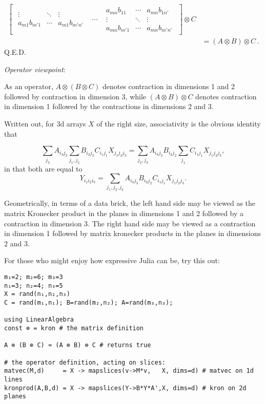 \documentclass[10pt,oneside]{article}
\begin{document}
\begin{enumerate}
\begin{align*}
\begin{bmatrix}
\begin{array}{ccc}
             \vdots & \ddots &           \vdots \\
  a_{m1}b_{m'1}  & \cdots & a_{m1}b_{m'n'} 
\end{array} & \cdots &  \begin{array}{ccc}
  a_{mn}b_{11}  & \cdots & a_{mn}b_{1n'} \\
             \vdots & \ddots &           \vdots \\
  a_{mn}b_{m'1}  & \cdots & a_{mn}b_{m'n'} 
\end{array}
\end{bmatrix} \otimes C \\
&= (A \otimes B) \otimes C \, .
\end{align*}
Q.E.D.

\newpage
\textit{Operator viewpoint}:

As an operator, $A \otimes (B \otimes C)$ denotes 
contraction in dimensions 1 and 2 followed
by contraction in dimension 3, while $(A \otimes B) \otimes C$ denotes contraction in dimension 1 followed by the contractions in dimensions 2 and 3.

Written out, for 3d arrays $X$ of the right size, associativity is the obvious identity that

$$\sum_{j_3}A_{i_3j_3}\sum_{j_1,j_2}  B_{i_2j_2}C_{i_1 j_1} X_{j_1j_2 j_3}
=
\sum_{j_2 ,j_3}A_{i_3j_3} B_{i_2j_2}
\sum_{j_1}C_{i_1 j_1} X_{j_1j_2 j_3} ,
$$
in that both are equal to
$$
Y_{i_1 i_2 i_3} = \sum_{j_1, j_2, j_3}A_{i_3j_3} B_{i_2j_2}
C_{i_1 j_1} X_{j_1j_2 j_3}.
$$

Geometrically, in terms of a data brick, the left hand side may be
viewed as the matrix Kronecker product in
the planes in dimensions 1 and 2 followed by
a contraction in dimension 3.  The right hand
side may be viewed as a contraction in dimension 1
followed by matrix kronecker products in the planes in dimensions 2 and 3.  

For those who might enjoy how expressive
Julia can be, try this out:

\begin{verbatim}
m₁=2; m₂=6; m₃=3
n₁=3; n₂=4; n₃=5
X = rand(n₁,n₂,n₃)
C = rand(m₁,n₁); B=rand(m₂,n₂); A=rand(m₃,n₃);

using LinearAlgebra
const ⊗ = kron # the matrix definition

A ⊗ (B ⊗ C) ≈ (A ⊗ B) ⊗ C # returns true

# the operator definition, acting on slices:
matvec(M,d)     = X -> mapslices(v->M*v,   X, dims=d) # matvec on 1d lines
kronprod(A,B,d) = X -> mapslices(Y->B*Y*A',X, dims=d) # kron on 2d planes


\end{verbatim}
\end{enumerate}
\end{document}

